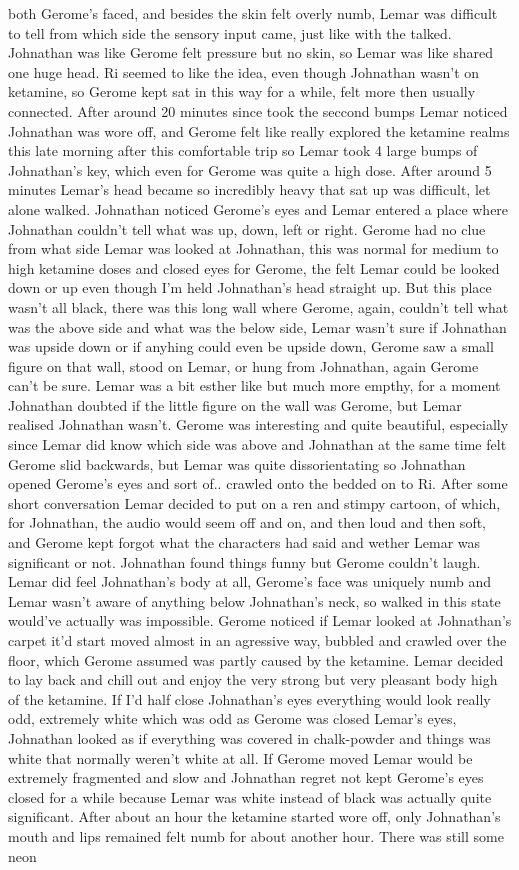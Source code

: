 \documentclass[12pt]{book}
\begin{document}
both Gerome's faced, and besides the skin felt overly numb, Lemar was difficult to tell from which side the sensory input came, just like with the talked. Johnathan was like Gerome felt pressure but no skin, so Lemar was like shared one huge head. Ri seemed to like the idea, even though Johnathan wasn't on ketamine, so Gerome kept sat in this way for a while, felt more then usually connected. After around 20 minutes since took the seccond bumps Lemar noticed Johnathan was wore off, and Gerome felt like really explored the ketamine realms this late morning after this comfortable trip so Lemar took 4 large bumps of Johnathan's key, which even for Gerome was quite a high dose. After around 5 minutes Lemar's head became so incredibly heavy that sat up was difficult, let alone walked. Johnathan noticed Gerome's eyes and Lemar entered a place where Johnathan couldn't tell what was up, down, left or right. Gerome had no clue from what side Lemar was looked at Johnathan, this was normal for medium to high ketamine doses and closed eyes for Gerome, the felt Lemar could be looked down or up even though I'm held Johnathan's head straight up. But this place wasn't all black, there was this long wall where Gerome, again, couldn't tell what was the above side and what was the below side, Lemar wasn't sure if Johnathan was upside down or if anyhing could even be upside down, Gerome saw a small figure on that wall, stood on Lemar, or hung from Johnathan, again Gerome can't be sure. Lemar was a bit esther like but much more empthy, for a moment Johnathan doubted if the little figure on the wall was Gerome, but Lemar realised Johnathan wasn't. Gerome was interesting and quite beautiful, especially since Lemar did know which side was above and Johnathan at the same time felt Gerome slid backwards, but Lemar was quite dissorientating so Johnathan opened Gerome's eyes and sort of.. crawled onto the bedded on to Ri. After some short conversation Lemar decided to put on a ren and stimpy cartoon, of which, for Johnathan, the audio would seem off and on, and then loud and then soft, and Gerome kept forgot what the characters had said and wether Lemar was significant or not. Johnathan found things funny but Gerome couldn't laugh. Lemar did feel Johnathan's body at all, Gerome's face was uniquely numb and Lemar wasn't aware of anything below Johnathan's neck, so walked in this state would've actually was impossible. Gerome noticed if Lemar looked at Johnathan's carpet it'd start moved almost in an agressive way, bubbled and crawled over the floor, which Gerome assumed was partly caused by the ketamine. Lemar decided to lay back and chill out and enjoy the very strong but very pleasant body high of the ketamine. If I'd half close Johnathan's eyes everything would look really odd, extremely white which was odd as Gerome was closed Lemar's eyes, Johnathan looked as if everything was covered in chalk-powder and things was white that normally weren't white at all. If Gerome moved Lemar would be extremely fragmented and slow and Johnathan regret not kept Gerome's eyes closed for a while because Lemar was white instead of black was actually quite significant. After about an hour the ketamine started wore off, only Johnathan's mouth and lips remained felt numb for about another hour. There was still some neon 
\end{document}
